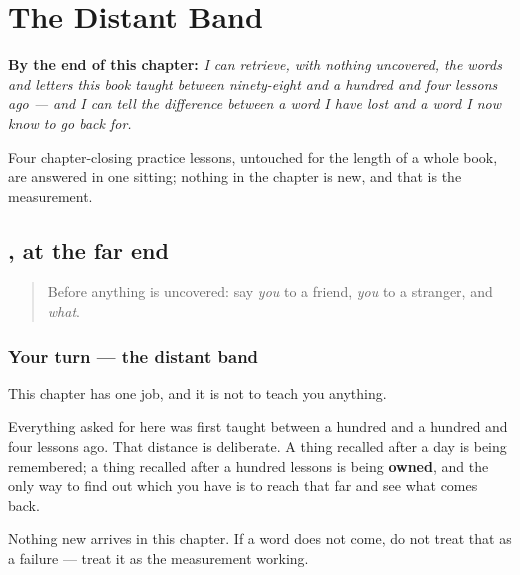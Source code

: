 
\chapter{The Distant Band}
\label{ch:bn-distant-band}

\begin{chapteropening}
\textbf{By the end of this chapter:} \emph{I can retrieve, with nothing uncovered, the words and letters this book taught between ninety-eight and a hundred and four lessons ago — and I can tell the difference between a word I have lost and a word I now know to go back for.}

Four chapter-closing practice lessons, untouched for the length of a whole book, are answered in one sitting; nothing in the chapter is new, and that is the measurement.
\end{chapteropening}

\section[Practice]{, at the far end}

\label{lesson:BN-R01-tumi-again}



\begin{quote}
Before anything is uncovered: say \emph{you} to a friend, \emph{you} to a stranger, and \emph{what}.
\end{quote}

\subsection*{Your turn — the distant band}
This chapter has one job, and it is not to teach you anything.

Everything asked for here was first taught between a hundred and a hundred and four lessons ago. That distance is deliberate. A thing recalled after a day is being remembered; a thing recalled after a hundred lessons is being \textbf{owned}, and the only way to find out which you have is to reach that far and see what comes back.

Nothing new arrives in this chapter. If a word does not come, do not treat that as a failure — treat it as the measurement working.

